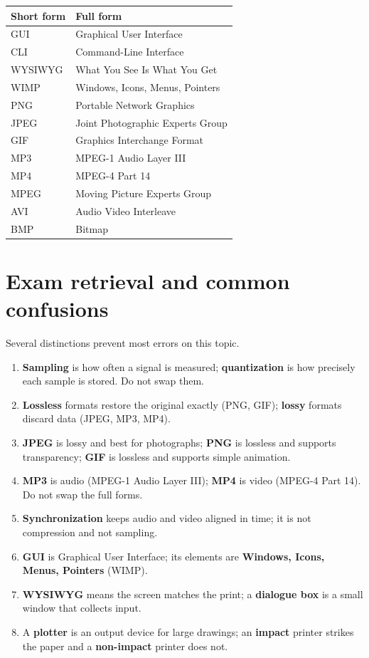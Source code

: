 \documentclass[11pt]{article}
\begin{document}
\begin{center}
\begin{tabular}{p{}p{}}
\toprule
\textbf{Short form} & \textbf{Full form} \\
\midrule
GUI & Graphical User Interface \\
CLI & Command-Line Interface \\
WYSIWYG & What You See Is What You Get \\
WIMP & Windows, Icons, Menus, Pointers \\
PNG & Portable Network Graphics \\
JPEG & Joint Photographic Experts Group \\
GIF & Graphics Interchange Format \\
MP3 & MPEG-1 Audio Layer III \\
MP4 & MPEG-4 Part 14 \\
MPEG & Moving Picture Experts Group \\
AVI & Audio Video Interleave \\
BMP & Bitmap \\
\bottomrule
\end{tabular}
\end{center}

\section{Exam retrieval and common confusions}
Several distinctions prevent most errors on this topic.
\begin{enumerate}
  \item \textbf{Sampling} is how often a signal is measured; \textbf{quantization}
    is how precisely each sample is stored. Do not swap them.
  \item \textbf{Lossless} formats restore the original exactly (PNG, GIF);
    \textbf{lossy} formats discard data (JPEG, MP3, MP4).
  \item \textbf{JPEG} is lossy and best for photographs; \textbf{PNG} is
    lossless and supports transparency; \textbf{GIF} is lossless and supports
    simple animation.
  \item \textbf{MP3} is audio (MPEG-1 Audio Layer III); \textbf{MP4} is video
    (MPEG-4 Part 14). Do not swap the full forms.
  \item \textbf{Synchronization} keeps audio and video aligned in time; it is
    not compression and not sampling.
  \item \textbf{GUI} is Graphical User Interface; its elements are
    \textbf{Windows, Icons, Menus, Pointers} (WIMP).
  \item \textbf{WYSIWYG} means the screen matches the print; a \textbf{dialogue
    box} is a small window that collects input.
  \item A \textbf{plotter} is an output device for large drawings; an
    \textbf{impact} printer strikes the paper and a \textbf{non-impact} printer
    does not.
\end{enumerate}
\end{document}
